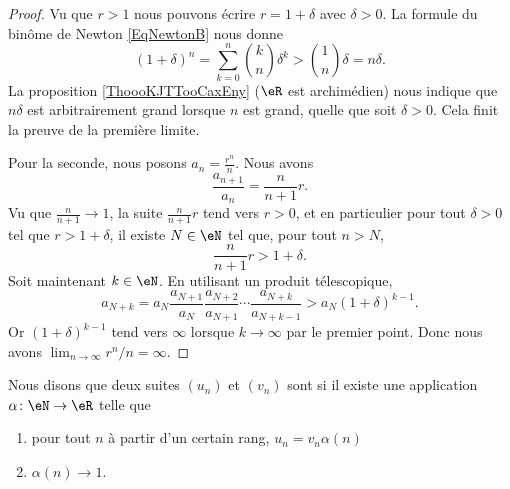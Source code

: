 \begin{proof}
    Vu que \( r>1\) nous pouvons écrire \( r=1+\delta\) avec \( \delta>0\). La formule du binôme de Newton \eqref{EqNewtonB} nous donne
    \begin{equation}
        (1+\delta)^n=\sum_{k=0}^n{k\choose n}\delta^k>{1\choose n}\delta=n\delta.
    \end{equation}
    La proposition \ref{ThoooKJTTooCaxEny} (\( \eR\) est archimédien) nous indique que \( n\delta\) est arbitrairement grand lorsque \( n\) est grand, quelle que soit \( \delta>0\). Cela finit la preuve de la première limite.

    Pour la seconde, nous posons \( a_n=\frac{ r^n }{ n }\). Nous avons
    \begin{equation}
        \frac{ a_{n+1} }{ a_n }=\frac{ n }{ n+1 }r.
    \end{equation}
    Vu que \( \frac{ n }{ n+1 }\to 1\), la suite \( \frac{ n }{ n+1 }r\) tend vers \( r>0\), et en particulier pour tout \( \delta>0\) tel que \( r>1+\delta\), il existe \( N\in \eN\) tel que, pour tout \( n > N \),
    \begin{equation}
        \frac{ n }{ n+1 }r>1+\delta.
    \end{equation}
    Soit maintenant \( k\in \eN\). En utilisant un produit télescopique,
    \begin{equation}
        a_{N+k}=a_N\frac{ a_{N+1} }{ a_N }\frac{ a_{N+2} }{ a_{N+1} }\cdots\frac{ a_{N+k} }{ a_{N+k-1} }>a_N(1+\delta)^{k-1}.
    \end{equation}
    Or \( (1+\delta)^{k-1}\) tend vers \( \infty\) lorsque \( k\to \infty\) par le premier point. Donc nous avons \( \lim_{n\to \infty} r^n/n=\infty\).
\end{proof}


\begin{definition}      \label{DEFooEWRTooKgShmT}
    Nous disons que deux suites \( (u_n)\) et \( (v_n)\) sont  si il existe une application \( \alpha\colon \eN\to \eR\) telle que
    \begin{enumerate}
        \item
            pour tout \( n\) à partir d'un certain rang, \( u_n=v_n\alpha(n)\)
        \item
            \( \alpha(n)\to 1\).
    \end{enumerate}
\end{definition}

